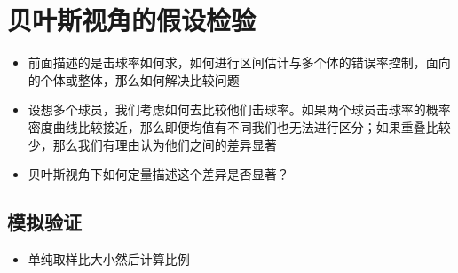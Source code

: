 \documentclass[]{book}
\newenvironment{Shaded}{\begin{snugshade}}{\end{snugshade}}
\newcommand{\CommentTok}[1]{\textcolor[rgb]{0.56,0.35,0.01}{\textit{#1}}}
\newcommand{\FloatTok}[1]{\textcolor[rgb]{0.00,0.00,0.81}{#1}}
\newcommand{\KeywordTok}[1]{\textcolor[rgb]{0.13,0.29,0.53}{\textbf{#1}}}
\newcommand{\NormalTok}[1]{#1}
\newcommand{\OperatorTok}[1]{\textcolor[rgb]{0.81,0.36,0.00}{\textbf{#1}}}
\newcommand{\StringTok}[1]{\textcolor[rgb]{0.31,0.60,0.02}{#1}}
\providecommand{\tightlist}{%
  \setlength{\itemsep}{0pt}\setlength{\parskip}{0pt}}
\begin{document}
\hypertarget{ux8d1dux53f6ux65afux89c6ux89d2ux7684ux5047ux8bbeux68c0ux9a8c}{%
\section{贝叶斯视角的假设检验}\label{ux8d1dux53f6ux65afux89c6ux89d2ux7684ux5047ux8bbeux68c0ux9a8c}}

\begin{itemize}
\item
  前面描述的是击球率如何求，如何进行区间估计与多个体的错误率控制，面向的个体或整体，那么如何解决比较问题
\item
  设想多个球员，我们考虑如何去比较他们击球率。如果两个球员击球率的概率密度曲线比较接近，那么即便均值有不同我们也无法进行区分；如果重叠比较少，那么我们有理由认为他们之间的差异显著
\item
  贝叶斯视角下如何定量描述这个差异是否显著？
\end{itemize}

\hypertarget{ux6a21ux62dfux9a8cux8bc1}{%
\subsection{模拟验证}\label{ux6a21ux62dfux9a8cux8bc1}}

\begin{itemize}
\tightlist
\item
  单纯取样比大小然后计算比例
\end{itemize}

\begin{Shaded}
\end{Shaded}
\end{document}
